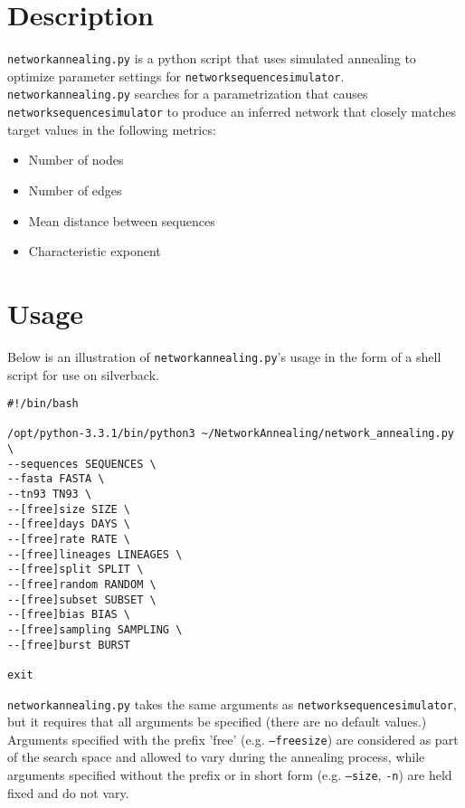 \documentclass[12pt]{scrartcl}
\begin{document}
\maketitle

\section{Description}
\texttt{network{\textunderscore}annealing.py} is a python script that uses simulated annealing to optimize parameter settings for \texttt{network{\textunderscore}sequence{\textunderscore}simulator}. \texttt{network{\textunderscore}annealing.py} searches for a parametrization that causes \texttt{network{\textunderscore}sequence{\textunderscore}simulator} to produce an inferred network that closely matches target values in the following metrics:

\begin{itemize}
\item Number of nodes 
\item Number of edges
\item Mean distance between sequences
\item Characteristic exponent
\end{itemize}

\section{Usage}
Below is an illustration of \texttt{network{\textunderscore}annealing.py}'s usage in the form of a shell script for use on silverback.
\begin{verbatim}
#!/bin/bash

/opt/python-3.3.1/bin/python3 ~/NetworkAnnealing/network_annealing.py \
--sequences SEQUENCES \
--fasta FASTA \
--tn93 TN93 \
--[free]size SIZE \
--[free]days DAYS \
--[free]rate RATE \
--[free]lineages LINEAGES \
--[free]split SPLIT \
--[free]random RANDOM \
--[free]subset SUBSET \
--[free]bias BIAS \
--[free]sampling SAMPLING \
--[free]burst BURST

exit
\end{verbatim}
\texttt{network{\textunderscore}annealing.py} takes the same arguments as \texttt{network{\textunderscore}sequence{\textunderscore}simulator}, but it requires that all arguments be specified (there are no default values.) Arguments specified with the prefix 'free' (e.g. \texttt{--freesize}) are considered as part of the search space and allowed to vary during the annealing process, while arguments specified without the prefix or in short form (e.g. \texttt{--size}, \texttt{-n}) are held fixed and do not vary. 
\end{document}
